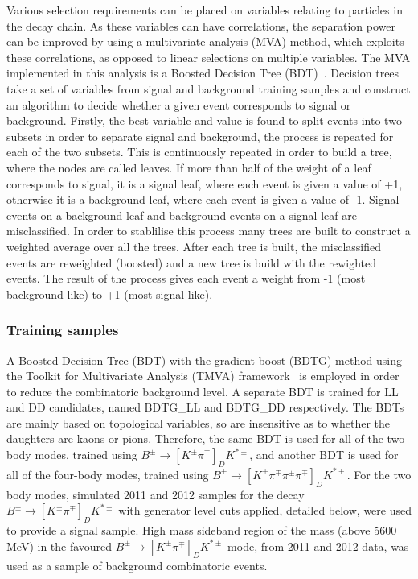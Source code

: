 Various selection requirements can be placed on variables relating to particles in the decay chain. As these variables can have correlations, the separation power can be improved by using a multivariate analysis (MVA) method, which exploits these correlations, as opposed to linear selections on multiple variables. The MVA implemented in this analysis is a Boosted Decision Tree (BDT)~\cite{Breiman}. Decision trees take a set of variables from signal and background training samples and construct an algorithm to decide whether a given event corresponds to signal or background. Firstly, the best variable and value is found to split events into two subsets in order to separate signal and background, the process is repeated for each of the two subsets. This is continuously repeated in order to build a tree, where the nodes are called leaves. If more than half of the weight of a leaf corresponds to signal, it is a signal leaf, where each event is given a value of +1, otherwise it is a background leaf, where each event is given a value of -1. Signal events on a background leaf and background events on a signal leaf are misclassified. In order to stablilise this process many trees are built to construct a weighted average over all the trees. After each tree is built, the misclassified events are reweighted (boosted) and a new tree is build with the rewighted events. The result of the process gives each event a weight from -1 (most background-like) to +1 (most signal-like). 

\subsubsection{Training samples}

A Boosted Decision Tree (BDT) with the gradient boost (BDTG) method using the Toolkit for Multivariate Analysis (TMVA) framework~\cite{TMVA} is employed in order to reduce the combinatoric background level. A separate BDT is trained for LL and DD candidates, named BDTG\_LL and BDTG\_DD respectively. The BDTs are mainly based on topological variables, so are insensitive as to whether the \D daughters are kaons or pions. Therefore, the same BDT is used for all of the two-body modes, trained using $B^{\pm} \to [K^{\pm}\pi^{\mp}]_D K^{*\pm}$, and another BDT is used for all of the four-body modes, trained using $B^{\pm} \to [K^{\pm}\pi^{\mp}\pi^{\pm}\pi^{\mp}]_D K^{*\pm}$. For the two body modes, simulated 2011 and 2012 samples for the decay $B^{\pm} \to [K^{\pm}\pi^{\mp}]_D K^{*\pm}$ with generator level cuts applied, detailed below, were used to provide a signal sample. High mass sideband region of the \B mass (above 5600 MeV) in the favoured $B^{\pm} \to [K^{\pm}\pi^{\mp}]_D K^{*\pm}$ mode, from 2011 and 2012 data, was used as a sample of background combinatoric events. 

